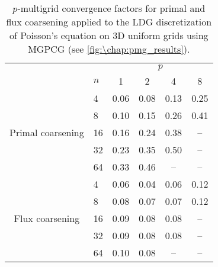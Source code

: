 \begin{table}[htb]
\caption{$p$-multigrid convergence factors for primal and flux coarsening applied to the LDG discretization of Poisson's equation on 3D uniform grids using MGPCG (see \cref{fig:\chap:pmg_results}).\vspace{-1.8em}}
\label{tab:3D_pmg}
\centering
\small
\begin{tabular}{@{}cl@{\qquad}cccc@{}}
&&&&& \\ \midrule
&& \multicolumn{4}{c}{$p$} \\
& $n$ & 1 & 2 & 4 & 8 \\ \cmidrule{1-6}
\multirow{5}{*}{Primal coarsening}
& 4 & 0.06 & 0.08 & 0.13 & 0.25 \\ 
& 8 & 0.10 & 0.15 & 0.26 & 0.41 \\ 
& 16 & 0.16 & 0.24 & 0.38 &  --  \\ 
& 32 & 0.23 & 0.35 & 0.50 &  --  \\ 
& 64 & 0.33 & 0.46 &  --  &  --  \\ \cmidrule{1-6}
\multirow{5}{*}{Flux coarsening}
& 4 & 0.06 & 0.04 & 0.06 & 0.12 \\ 
& 8 & 0.08 & 0.07 & 0.07 & 0.12 \\ 
& 16 & 0.09 & 0.08 & 0.08 &  --  \\ 
& 32 & 0.09 & 0.08 & 0.08 &  --  \\ 
& 64 & 0.10 & 0.08 &  --  &  --  \\ \midrule
\end{tabular}
\end{table}

